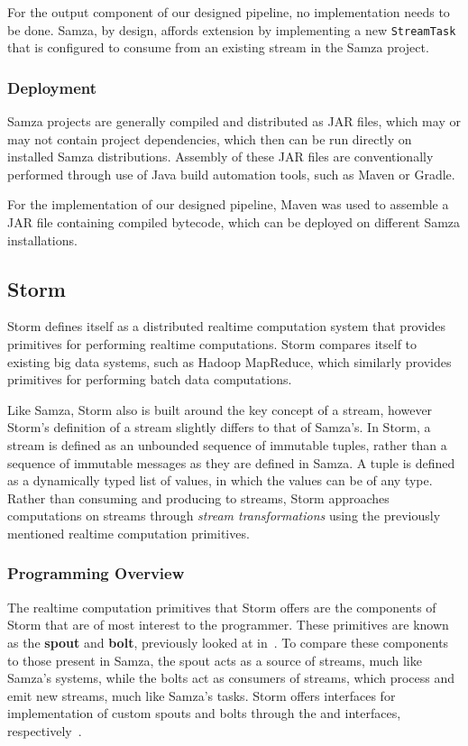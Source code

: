 For the output component of our designed pipeline, no implementation needs to be done. Samza, by design, affords extension
by implementing a new \texttt{StreamTask} that is configured to consume from an existing stream in the Samza project.

\subsubsection{Deployment}

Samza projects are generally compiled and distributed as JAR files, which may or may not contain project dependencies,
which then can be run directly on installed Samza distributions. Assembly of these JAR files are conventionally performed
through use of Java build automation tools, such as Maven or Gradle.

For the implementation of our designed pipeline, Maven was used to assemble a JAR file containing compiled bytecode, which can be deployed on different
Samza installations.



\subsection{Storm} %
\label{ssub:impl_storm}

Storm defines itself as a distributed realtime computation system that provides primitives for performing realtime
computations. Storm compares itself to existing big data systems, such as Hadoop MapReduce, which similarly provides
primitives for performing batch data computations.

Like Samza, Storm also is built around the key concept of a stream, however Storm's definition of a stream slightly
differs to that of Samza's. In Storm, a stream is defined as an unbounded sequence of immutable tuples, rather than a sequence
of immutable messages as they are defined in Samza. A tuple is defined as a dynamically typed list of values, in which
the values can be of any type. Rather than consuming and producing to streams, Storm approaches computations on streams
through \textit{stream transformations} using the previously mentioned realtime computation primitives.

\subsubsection{Programming Overview}

The realtime computation primitives that Storm offers are the components of Storm that are of most interest to the programmer.
These primitives are known as the \textbf{spout} and \textbf{bolt}, previously looked at in~. To compare
these components to those present in Samza, the spout acts as a source of streams, much like Samza's systems, while the
bolts act as consumers of streams, which process and emit new streams, much like Samza's tasks. Storm offers interfaces
for implementation of custom spouts and bolts through the  and 
interfaces, respectively~\cite{storm_doc}.

